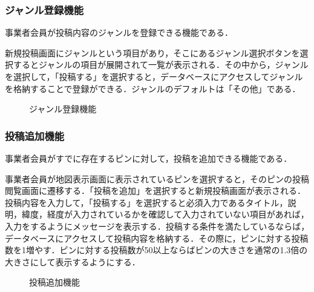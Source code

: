 \subsubsection{ジャンル登録機能}
事業者会員が投稿内容のジャンルを登録できる機能である．

新規投稿画面にジャンルという項目があり，そこにあるジャンル選択ボタンを選択するとジャンルの項目が展開されて一覧が表示される．その中から，ジャンルを選択して，「投稿する」を選択すると，データベースにアクセスしてジャンルを格納することで登録ができる．ジャンルのデフォルトは「その他」である．

\begin{figure}[H]
    \centering
    
    \caption{ジャンル登録機能}
    \label{fig:pinpost_bus4}
\end{figure}

\subsubsection{投稿追加機能}
事業者会員がすでに存在するピンに対して，投稿を追加できる機能である．

事業者会員が地図表示画面に表示されているピンを選択すると，そのピンの投稿閲覧画面に遷移する．「投稿を追加」を選択すると新規投稿画面が表示される．投稿内容を入力して，「投稿する」を選択すると必須入力であるタイトル，説明，緯度，経度が入力されているかを確認して入力されていない項目があれば，入力をするようにメッセージを表示する．投稿する条件を満たしているならば，データベースにアクセスして投稿内容を格納する．その際に，ピンに対する投稿数を1増やす．ピンに対する投稿数が50以上ならばピンの大きさを通常の1.3倍の大きさにして表示するようにする．

\begin{figure}[H]
    \centering
    
    \caption{投稿追加機能}
    \label{fig:pinpost_bus5}
\end{figure}